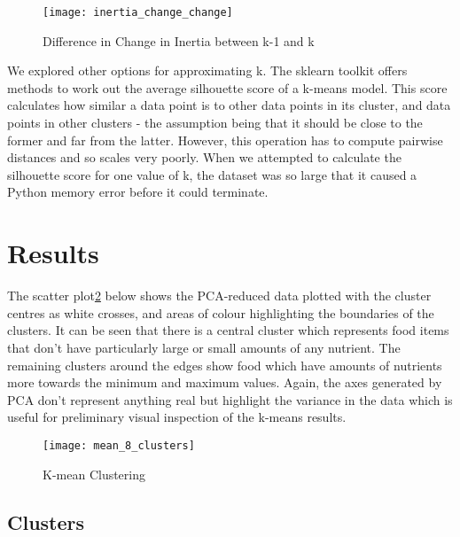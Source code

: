 \documentclass[journal]{IEEEtran}
\begin{document}
\begin{figure}[ht]
\centering
\texttt{[image: inertia\_change\_change]}
\caption{Difference in Change in Inertia between k-1 and k}
\label{fig:inertia_diff}
\end{figure}

We explored other options for approximating k. The sklearn toolkit offers methods to work out the average silhouette score of a k-means model. This score calculates how similar a data point is to other data points in its cluster, and data points in other clusters - the assumption being that it should be close to the former and far from the latter. However, this operation has to compute pairwise distances and so scales very poorly. When we attempted to calculate the silhouette score for one value of k, the dataset was so large that it caused a Python memory error before it could terminate.

\section{Results}

The scatter plot\ref{fig:scatter_plot} below shows the PCA-reduced data plotted with the cluster centres as white crosses, and areas of colour highlighting the boundaries of the clusters. It can be seen that there is a central cluster which represents food items that don’t have particularly large or small amounts of any nutrient. The remaining clusters around the edges show food which have amounts of nutrients more towards the minimum and maximum values. Again, the axes generated by PCA don’t represent anything real but highlight the variance in the data which is useful for preliminary visual inspection of the k-means results.

\begin{figure}[ht]
\centering
\texttt{[image: mean\_8\_clusters]}
\caption{K-mean Clustering}
\label{fig:scatter_plot}
\end{figure}

\subsection{Clusters}
\end{document}
